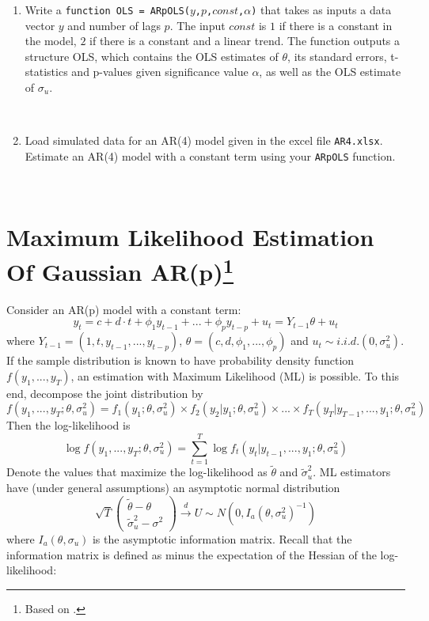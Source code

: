 \documentclass[a4paper]{scrartcl}
\begin{document}
\begin{enumerate}
	\item Write a \texttt{function OLS = ARpOLS($y$,$p$,$const$,$\alpha$)} that takes as inputs a data vector $y$ and number of lags $p$. The input $const$ is $1$ if there is a constant in the model, $2$ if there is a constant and a linear trend. The function outputs a structure OLS, which contains the OLS estimates of $\theta$, its standard errors, t-statistics and p-values given significance value $\alpha$, as well as the OLS estimate of $\sigma_u$.
	\begin{solution}~
		
	\end{solution}	
	\item Load simulated data for an AR(4) model given in the excel file \texttt{AR4.xlsx}. Estimate an AR(4) model with a constant term using your \texttt{ARpOLS} function.
	\begin{solution}~
		
\newpage %
	\end{solution}
	
\end{enumerate}
\newpage

\section[Maximum Likelihood Estimation Of Gaussian AR(p)]{Maximum Likelihood Estimation Of Gaussian AR(p)\footnote{Based on \cite{Luetkepohl.2004}.}}\label{ex:MLARpGaussian}
Consider an AR(p) model with a constant term:
$$ y_t = c + d\cdot t + \phi_1 y_{t-1} +... + \phi_p y_{t-p} +u_{t}=Y_{t-1}\theta + u_t$$
where $Y_{t-1}=(1,t, y_{t-1},...,y_{t-p})$, $\theta = (c,d,\phi_1,...,\phi_p)$ and $u_t\sim i.i.d.(0,\sigma_u^2)$. If the sample distribution is known to have probability density function $f(y_1,...,y_T)$, an estimation with Maximum Likelihood (ML) is possible. To this end, decompose the joint distribution by
$$f(y_1,...,y_T;\theta,\sigma_u^2)= f_1(y_1;\theta,\sigma_u^2) \times f_2(y_2|y_1;\theta,\sigma_u^2)\times ... \times f_T(y_T|y_{T-1},...,y_1;\theta,\sigma_u^2)$$ Then the log-likelihood is
$$\log f(y_1,...,y_T;\theta,\sigma_u^2)=\sum_{t=1}^T \log f_t(y_t|y_{t-1},...,y_1;\theta,\sigma_u^2)$$
Denote the values that maximize the log-likelihood as $\tilde{\theta}$ and $\tilde{\sigma}_u^2$. ML estimators have (under general assumptions) an asymptotic normal distribution
$$\sqrt{T}\begin{pmatrix}\tilde{\theta}-\theta\\\tilde{\sigma}^2_u - \sigma^2 \end{pmatrix} \overset{d}{\rightarrow} U \sim N(0,I_a(\theta,\sigma_u^2)^{-1})$$
where $I_a(\theta,\sigma_u)$ is the asymptotic information matrix. Recall that the information matrix is defined  as minus the expectation of the Hessian of the log-likelihood:
\end{document}
